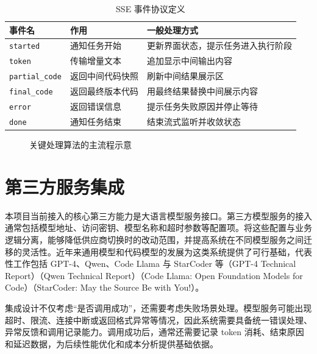 \begin{table}[htbp]
\centering
\caption{SSE 事件协议定义}
\label{tab:chapter2-sse-events}
\small
\begin{tabular}{@{}p{}p{}p{}@{}}
\toprule
事件名 & 作用 & 一般处理方式 \\
\midrule
\texttt{started} & 通知任务开始 & 更新界面状态，提示任务进入执行阶段 \\
\texttt{token} & 传输增量文本 & 追加显示中间输出内容 \\
\texttt{partial\_code} & 返回中间代码快照 & 刷新中间结果展示区 \\
\texttt{final\_code} & 返回最终版本代码 & 用最终结果替换中间展示内容 \\
\texttt{error} & 返回错误信息 & 提示任务失败原因并停止等待 \\
\texttt{done} & 通知任务结束 & 结束流式监听并收敛状态 \\
\bottomrule
\end{tabular}
\end{table}

\begin{figure}[htbp]
\centering
{}
\caption{关键处理算法的主流程示意}
\label{fig:chapter2-key-algo-flow}
\end{figure}

\section{第三方服务集成}
本项目当前接入的核心第三方能力是大语言模型服务接口。第三方模型服务的接入通常包括模型地址、访问密钥、模型名称和超时参数等配置项。将这些配置与业务逻辑分离，能够降低供应商切换时的改动范围，并提高系统在不同模型服务之间迁移的灵活性。近年来通用模型和代码模型的发展为这类系统提供了可行基础，代表性工作包括 GPT-4、Qwen、Code Llama 与 StarCoder 等（GPT-4 Technical Report）（Qwen Technical Report）（Code Llama: Open Foundation Models for Code）（StarCoder: May the Source Be with You!）\cite{openai2023gpt4}\cite{bai2023qwen}\cite{roziere2023codellama}\cite{li2023starcoder}。

集成设计不仅考虑“是否调用成功”，还需要考虑失败场景处理。模型服务可能出现超时、限流、连接中断或返回格式异常等情况，因此系统需要具备统一错误处理、异常反馈和调用记录能力。调用成功后，通常还需要记录 token 消耗、结束原因和延迟数据，为后续性能优化和成本分析提供基础依据。

